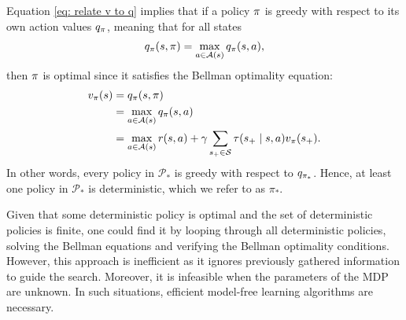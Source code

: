 Equation \eqref{eq: relate v to q} implies that if a policy $\pi$ is greedy with respect to its own action values $q_\pi$, meaning that for all states
\begin{align*}
    q_{\pi}(s, \pi) = \max_{a \in \mathcal{A}(s)} q_{\pi}(s,a),
\end{align*}
then $\pi$ is optimal since it satisfies the Bellman optimality equation:
\begin{align*}
    v_{\pi}(s) 
    &= q_{\pi}(s, \pi)
    \\
    &= \max_{a \in \mathcal{A}(s)} q_{\pi}(s, a)
    \\
    &= \max_{a \in \mathcal{A}(s)} r(s, a) + \gamma \sum_{s_+ \in \mathcal{S}} \tau(s_+ \mid s, a) v_{\pi}(s_+) .
\end{align*}
In other words, every policy in $\mathcal P_*$ is greedy with respect to $q_{{\pi}_*}$.
Hence, at least one policy in $\mathcal P_*$ is deterministic, which we refer to as $\pi_*$.


Given that some deterministic policy is optimal and the set of deterministic policies is finite, one could find it by looping through all deterministic policies, solving the Bellman equations and verifying the Bellman optimality conditions.
However, this approach is inefficient as it ignores previously gathered information to guide the search.
Moreover, it is infeasible when the parameters of the MDP are unknown.
In such situations, efficient model-free learning algorithms are necessary.

